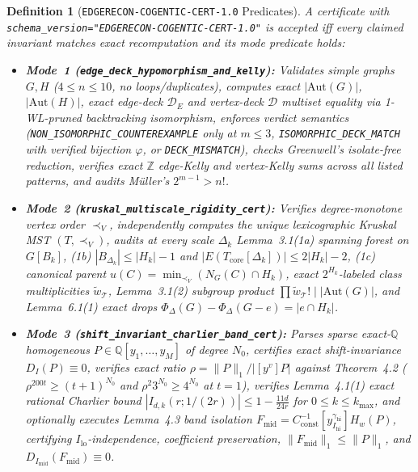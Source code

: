 \documentclass[10pt,twocolumn]{article}
\newtheorem{definition}{Definition}
\newcommand{\ZZ}{\mathbb{Z}}
\newcommand{\QQ}{\mathbb{Q}}
\begin{document}
\begin{definition}[\texttt{EDGERECON-COGENTIC-CERT-1.0} Predicates]\label{def:cert}
\normalfont A certificate with \texttt{schema\_\allowbreak version="EDGERECON-\allowbreak COGENTIC-\allowbreak CERT-1.0"} is accepted iff every claimed invariant matches exact recomputation and its mode predicate holds:
\begin{itemize}[leftmargin=1.2em,itemsep=1pt,topsep=2pt]
  \item \textbf{Mode~1 (\texttt{edge\_\allowbreak deck\_\allowbreak hypomorphism\_\allowbreak and\_\allowbreak kelly}):} Validates simple graphs $G,H$ ($4\le n\le 10$, no loops/duplicates), computes exact $|\mathrm{Aut}(G)|$, $|\mathrm{Aut}(H)|$, exact edge-deck $\mathcal{D}_E$ and vertex-deck $\mathcal{D}$ multiset equality via 1-WL-pruned backtracking isomorphism, enforces verdict semantics (\texttt{NON\_\allowbreak ISOMORPHIC\_\allowbreak COUNTEREXAMPLE} only at $m\le 3$, \texttt{ISOMORPHIC\_\allowbreak DECK\_\allowbreak MATCH} with verified bijection $\varphi$, or \texttt{DECK\_\allowbreak MISMATCH}), checks Greenwell's isolate-free reduction, verifies exact $\ZZ$ edge-Kelly and vertex-Kelly sums across all listed patterns, and audits M\"uller's $2^{m-1} > n!$.
  \item \textbf{Mode~2 (\texttt{kruskal\_\allowbreak multiscale\_\allowbreak rigidity\_\allowbreak cert}):} Verifies degree-monotone vertex order $\prec_V$, independently computes the unique lexicographic Kruskal MST $(T,\prec_V)$, audits at every scale $\Delta_k$ Lemma~3.1(1a) spanning forest on $G[B_k]$, (1b) $|B_{\Delta_k}|\le |H_k|-1$ and $|E(T_{\mathrm{core}}[\Delta_k])|\le 2|H_k|-2$, (1c) canonical parent $u(C)=\min_{\prec_V}(N_G(C)\cap H_k)$, exact $2^{H_k}$-labeled class multiplicities $\tilde{w}_{\mathcal{T}}$, Lemma~3.1(2) subgroup product $\prod\tilde{w}_{\mathcal{T}}!\mid |\mathrm{Aut}(G)|$, and Lemma~6.1(1) exact drops $\Phi_\Delta(G)-\Phi_\Delta(G-e)=|e\cap H_k|$.
  \item \textbf{Mode~3 (\texttt{shift\_\allowbreak invariant\_\allowbreak charlier\_\allowbreak band\_\allowbreak cert}):} Parses sparse exact-$\QQ$ homogeneous $P\in\QQ[y_1,\dots,y_M]$ of degree $N_0$, certifies exact shift-invariance $D_I(P)\equiv 0$, verifies exact ratio $\rho=\|P\|_1/|[y^v]P|$ against Theorem~4.2 ($\rho^{200t}\ge (t+1)^{N_0}$ and $\rho^2 3^{N_0}\ge 4^{N_0}$ at $t{=}1$), verifies Lemma~4.1(1) exact rational Charlier bound $|I_{d,k}(r;1/(2r))|\le 1-\frac{11d}{24r}$ for $0\le k\le k_{\max}$, and optionally executes Lemma~4.3 band isolation $F_{\mathrm{mid}} = C_{\mathrm{const}}^{-1}[y_{I_{\mathrm{hi}}}^{\gamma_{\mathrm{hi}}}]H_w(P)$, certifying $I_{\mathrm{lo}}$-independence, coefficient preservation, $\|F_{\mathrm{mid}}\|_1\le \|P\|_1$, and $D_{I_{\mathrm{mid}}}(F_{\mathrm{mid}})\equiv 0$.

\end{itemize}
\end{definition}
\end{document}
